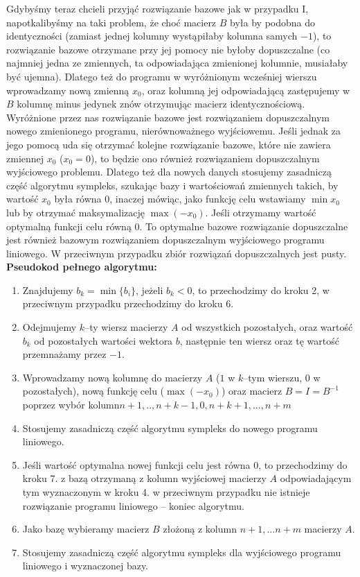 \documentclass[licencjacka]{pracamgr}
\begin{document}
Gdybyśmy teraz chcieli przyjąć rozwiązanie bazowe jak w przypadku I, napotkalibyśmy na taki problem, że choć macierz $B$ była by podobna do identyczności
(zamiast jednej kolumny wystąpiłaby kolumna samych $-1$), to rozwiązanie bazowe otrzymane przy jej pomocy nie byłoby dopuszczalne
(co najmniej jedna ze zmiennych, ta odpowiadająca zmienionej kolumnie, musiałaby być ujemna). Dlatego też do programu w wyróżnionym wcześniej wierszu wprowadzamy nową zmienną $x_0$, oraz
kolumną jej odpowiadającą zastępujemy w $B$ kolumnę minus jedynek znów otrzymując macierz identycznościową.
Wyróżnione przez nas rozwiązanie bazowe jest rozwiązaniem dopuszczalnym nowego zmienionego programu, nierównoważnego wyjściowemu.
Jeśli jednak za jego pomocą uda się otrzymać kolejne rozwiązanie bazowe, które nie zawiera zmiennej $x_0$ ($x_0=0$), to będzie ono również rozwiązaniem dopuszczalnym wyjściowego problemu.
Dlatego też dla nowych danych stosujemy zasadniczą część algorytmu sympleks, szukając bazy i wartościowań zmiennych takich, by wartość $x_0$ była równa $0$, inaczej mówiąc,
jako funkcję celu wstawiamy $\min x_0$ lub by otrzymać maksymalizację $\max (-x_0)$. Jeśli otrzymamy wartość optymalną funkcji celu równą $0$.
To optymalne bazowe rozwiązanie dopuszczalne jest również bazowym rozwiązaniem dopuszczalnym wyjściowego programu liniowego.
W przeciwnym przypadku zbiór rozwiązań dopuszczalnych jest pusty.\newline\newline
%
\textbf{Pseudokod pełnego algorytmu:}
\begin{enumerate}
\item Znajdujemy $b_k=\min{\{b_i\}}$, jeżeli $b_k<0$, to przechodzimy do kroku 2, w przeciwnym przypadku przechodzimy do kroku 6.
\item Odejmujemy $k$--ty wiersz macierzy $A$ od wszystkich pozostałych, oraz wartość $b_k$ od pozostałych wartości wektora $b$, następnie ten wiersz oraz tę wartość przemnażamy przez $-1$.
\item Wprowadzamy nową kolumnę do macierzy $A$ ($1$ w $k$--tym wierszu, $0$ w pozostałych), nową funkcję celu ($\max (-x_0)$)
oraz macierz $B=I=B^{-1}$ poprzez wybór kolumn\newline $n+1,..,n+k-1,0,n+k+1,...,n+m$
\item Stosujemy zasadniczą część algorytmu sympleks do nowego programu liniowego.
\item Jeśli wartość optymalna nowej funkcji celu jest równa 0, to przechodzimy do kroku 7. z bazą otrzymaną z kolumn wyjściowej macierzy $A$ odpowiadającym tym wyznaczonym w kroku 4. 
w przeciwnym przypadku nie istnieje rozwiązanie programu liniowego -- koniec algorytmu.
\item Jako bazę wybieramy macierz $B$ złożoną z kolumn $n+1,...n+m$ macierzy $A$.
\item Stosujemy zasadniczą część algorytmu sympleks dla wyjściowego programu liniowego i wyznaczonej bazy.
\end{enumerate}
\end{document}
